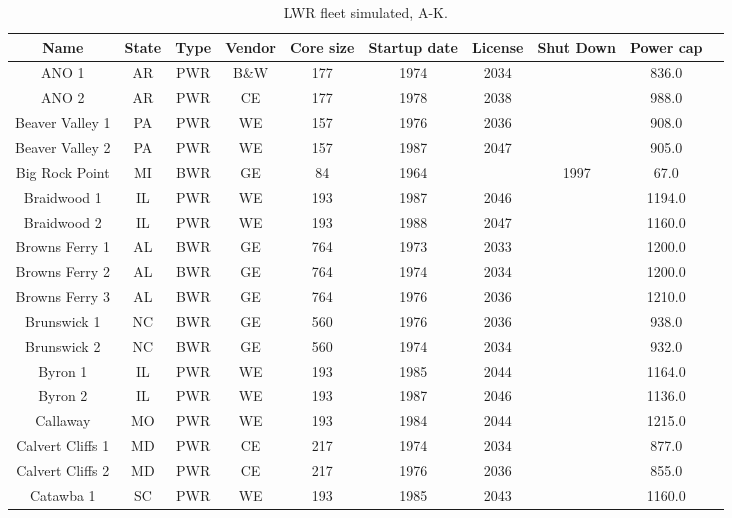 \begin{table}[H]
    \centering
    \caption{LWR fleet simulated, A-K.}
    \label{tab:lwr_fleet_1}
    \begin{tabular}{c c c c c c c c c c}
    \hline
    \textbf{Name} & \textbf{State} & \textbf{Type} & \textbf{Vendor} & \textbf{Core size} & \textbf{Startup date} & \textbf{License} & \textbf{Shut Down} & \textbf{Power cap} \\
    \hline
    ANO 1                 &AR & PWR & B\&W & 177 & 1974 & 2034 &      & 836.0 \\
    ANO 2                 &AR & PWR & CE   & 177 & 1978 & 2038 &      & 988.0 \\
    Beaver Valley 1       &PA & PWR & WE   & 157 & 1976 & 2036 &      & 908.0 \\
    Beaver Valley 2       &PA & PWR & WE   & 157 & 1987 & 2047 &      & 905.0 \\
    Big Rock Point        &MI & BWR & GE   & 84  & 1964 &      & 1997 & 67.0  \\
    Braidwood 1           &IL & PWR & WE   & 193 & 1987 & 2046 &      & 1194.0\\
    Braidwood 2           &IL & PWR & WE   & 193 & 1988 & 2047 &      & 1160.0\\
    Browns Ferry 1        &AL & BWR & GE   & 764 & 1973 & 2033 &      & 1200.0\\
    Browns Ferry 2        &AL & BWR & GE   & 764 & 1974 & 2034 &      & 1200.0\\
    Browns Ferry 3        &AL & BWR & GE   & 764 & 1976 & 2036 &      & 1210.0\\
    Brunswick 1           &NC & BWR & GE   & 560 & 1976 & 2036 &      & 938.0 \\
    Brunswick 2           &NC & BWR & GE   & 560 & 1974 & 2034 &      & 932.0 \\
    Byron 1               &IL & PWR & WE   & 193 & 1985 & 2044 &      & 1164.0\\
    Byron 2               &IL & PWR & WE   & 193 & 1987 & 2046 &      & 1136.0\\
    Callaway              &MO & PWR & WE   & 193 & 1984 & 2044 &      & 1215.0\\
    Calvert Cliffs 1      &MD & PWR & CE   & 217 & 1974 & 2034 &      & 877.0 \\
    Calvert Cliffs 2      &MD & PWR & CE   & 217 & 1976 & 2036 &      & 855.0 \\
    Catawba 1             &SC & PWR & WE   & 193 & 1985 & 2043 &      & 1160.0\\

\end{tabular}
\end{table}
